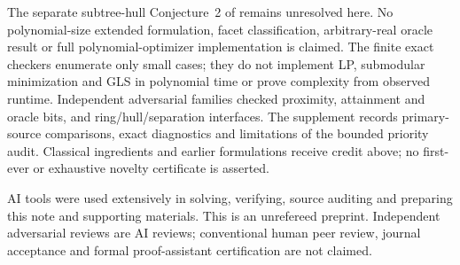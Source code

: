 \documentclass[11pt]{article}
\begin{document}
The separate subtree-hull Conjecture~2 of \cite{OWR} remains unresolved here.
No polynomial-size extended formulation, facet classification, arbitrary-real
oracle result or full polynomial-optimizer implementation is claimed.
The finite exact checkers enumerate only small cases; they do not implement
LP, submodular minimization and GLS in polynomial time or prove complexity
from observed runtime. Independent adversarial families checked proximity,
attainment and oracle bits, and ring/hull/separation interfaces. The supplement
records primary-source comparisons, exact diagnostics and limitations of the
bounded priority audit. Classical ingredients and earlier formulations receive
credit above; no first-ever or exhaustive novelty certificate is asserted.

AI tools were used extensively in solving, verifying, source auditing and
preparing this note and supporting materials. This is an unrefereed preprint.
Independent adversarial reviews are AI reviews; conventional human peer review,
journal acceptance and formal proof-assistant certification are not claimed.
\end{document}

